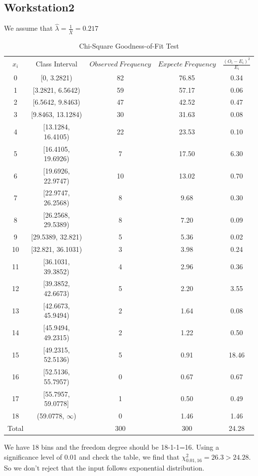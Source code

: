 \documentclass{article}
\begin{document}
\subsection{Workstation2}
We assume that $\hat{\lambda}=\frac{1}{\bar{X}}=0.217$
\begin{table}[htp]
\caption{Chi-Square Goodness-of-Fit Test}
\begin{center}
\begin{tabular}{ccccc}
\hline
$x_i$ & Class Interval & $Observed\ Frequency$ & $Expecte\ Frequency$ & $\frac{(O_i-E_i)^2}{E_i}$\\
0&[0, 3.2821)&82&76.85&0.34\\
1&[3.2821, 6.5642)&59&57.17&0.06\\
2&[6.5642, 9.8463)&47&42.52&0.47\\
3&[9.8463, 13.1284)&30&31.63&0.08\\
4&[13.1284, 16.4105)&22&23.53&0.10\\
5&[16.4105, 19.6926)&7&17.50&6.30\\
6&[19.6926, 22.9747)&10&13.02&0.70\\
7&[22.9747, 26.2568)&8&9.68&0.30\\
8&[26.2568, 29.5389)&8&7.20&0.09\\
9&[29.5389, 32.821)&5&5.36&0.02\\
10&[32.821, 36.1031)&3&3.98&0.24\\
11&[36.1031, 39.3852)&4&2.96&0.36\\
12&[39.3852, 42.6673)&5&2.20&3.55\\
13&[42.6673, 45.9494)&2&1.64&0.08\\
14&[45.9494, 49.2315)&2&1.22&0.50\\
15&[49.2315, 52.5136)&5&0.91&18.46\\
16&[52.5136, 55.7957)&0&0.67&0.67\\
17&[55.7957, 59.0778]&1&0.50&0.49\\
18&(59.0778, $\infty$)&0&1.46&1.46\\
\hline
Total& &300&300&24.28\\

\hline

\end{tabular}
\end{center}
\label{default}
\end{table}%

We have 18 bins and the freedom degree should be 18-1-1=16. Using a significance level of 0.01 and check the table, we find that $\chi^2_{0.01, 16}=26.3 > 24.28$. So we don't reject that the input follows exponential distribution.
\end{document}
